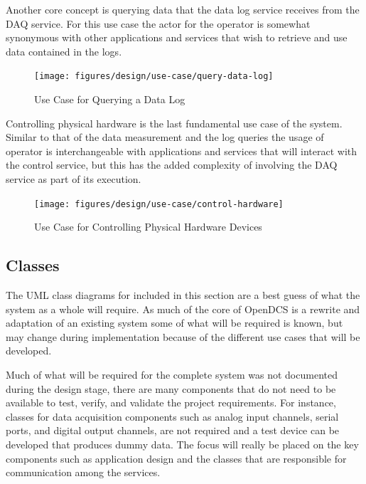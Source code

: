     \newpage

    Another core concept is querying data that the data log service receives
    from the DAQ service. For this use case the actor for the operator is
    somewhat synonymous with other applications and services that wish to
    retrieve and use data contained in the logs.

    \begin{figure}[H]
      \texttt{[image: figures/design/use-case/query-data-log]}
      \caption{Use Case for Querying a Data Log}
      \label{fig:dsg-use-query}
    \end{figure}

    Controlling physical hardware is the last fundamental use case of the
    system. Similar to that of the data measurement and the log queries the
    usage of operator is interchangeable with applications and services that
    will interact with the control service, but this has the added complexity
    of involving the DAQ service as part of its execution.

    \begin{figure}[H]
      \texttt{[image: figures/design/use-case/control-hardware]}
      \caption{Use Case for Controlling Physical Hardware Devices}
      \label{fig:dsg-use-control-hw}
    \end{figure}

  \subsection{Classes}\label{sec:dsg-classes}

    The UML class diagrams for included in this section are a best guess of
    what the system as a whole will require. As much of the core of OpenDCS
    is a rewrite and adaptation of an existing system some of what will be
    required is known, but may change during implementation because of the
    different use cases that will be developed.

    Much of what will be required for the complete system was not documented
    during the design stage, there are many components that do not need to be
    available to test, verify, and validate the project requirements. For
    instance, classes for data acquisition components such as analog input
    channels, serial ports, and digital output channels, are not required and
    a test device can be developed that produces dummy data. The focus will
    really be placed on the key components such as application design and the
    classes that are responsible for communication among the services.

